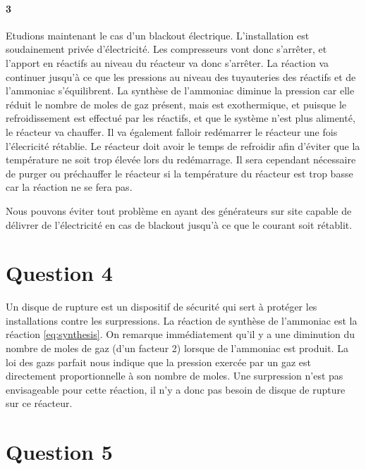 \documentclass[a4paper,oneside,12pt]{article}
\begin{document}
\paragraph{3} Etudions maintenant le cas d'un blackout électrique. 
L'installation est soudainement privée d'électricité. 
Les compresseurs vont donc s'arrêter, et l'apport en réactifs au niveau 
du réacteur va donc s'arrêter.
La réaction va continuer jusqu'à ce que les pressions au niveau des tuyauteries 
des réactifs et de l'ammoniac s'équilibrent.
La synthèse de l'ammoniac diminue la pression car elle réduit le nombre de moles 
de gaz présent, mais est exothermique, et puisque le refroidissement est effectué 
par les réactifs, et que le système n'est plus alimenté, le réacteur va chauffer.
Il va également falloir redémarrer le réacteur une fois l'élecricité rétablie. 
Le réacteur doit avoir le temps de refroidir afin d'éviter 
que la température ne soit trop élevée lors du redémarrage. 
Il sera cependant nécessaire de purger ou préchauffer le réacteur si
la température du réacteur est trop basse car la réaction ne se fera pas.

Nous pouvons éviter tout problème en ayant des générateurs sur site capable 
de délivrer de l'électricité en cas de blackout jusqu'à ce que 
le courant soit rétablit. 

\section*{Question 4}

Un disque de rupture est un dispositif de sécurité qui sert à protéger les installations 
contre les surpressions.
La réaction de synthèse de l'ammoniac est la réaction \ref{eq:synthesis}.
On remarque immédiatement qu'il y a une diminution du nombre de moles de gaz (d'un facteur 2) 
lorsque de l'ammoniac est produit. La loi des gazs parfait nous indique que la pression
exercée par un gaz est directement proportionnelle à son nombre de moles.
Une surpression n'est pas envisageable pour cette réaction, 
il n'y a donc pas besoin de disque de rupture sur ce réacteur.

\section*{Question 5}
\end{document}
